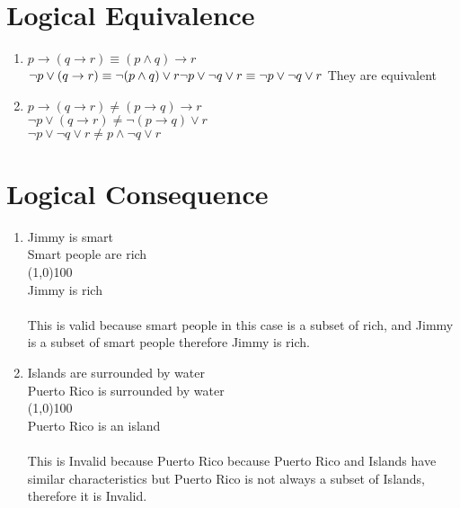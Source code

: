 \documentclass{article}
\begin{document}
\section{Logical Equivalence}
\begin{enumerate}
    \item $p \to (q \to r) \equiv (p \land q) \to r$\\
    $\lnot p \lor (q \to r) \equiv \lnot(p \land q) \lor r\\ 
    \lnot p \lor \lnot q \lor r \equiv \lnot p \lor \lnot q \lor r\\$
    They are equivalent
    \item $p \to (q \to r) \ne (p \to q) \to r$\\
    $\lnot p \lor (q \to r) \ne \lnot(p \to q) \lor r$\\
    $\lnot p \lor \lnot q \lor r \ne p \land \lnot q \lor r$
\end{enumerate}
\section{Logical Consequence}
\begin{enumerate}
    \item Jimmy is smart\\Smart people are rich\\
    \line(1,0){100}\\Jimmy is rich\\ \\This is valid because smart people in this case is a subset of rich, and Jimmy is a subset of smart people therefore Jimmy is rich.
    \item Islands are surrounded by water\\Puerto Rico is surrounded by water\\
    \line(1,0){100}\\
    Puerto Rico is an island\\
    
    \\ This is Invalid because Puerto Rico because Puerto Rico and Islands have similar characteristics but Puerto Rico is not always a subset of Islands, therefore it is Invalid.
\end{enumerate}
\end{document}

